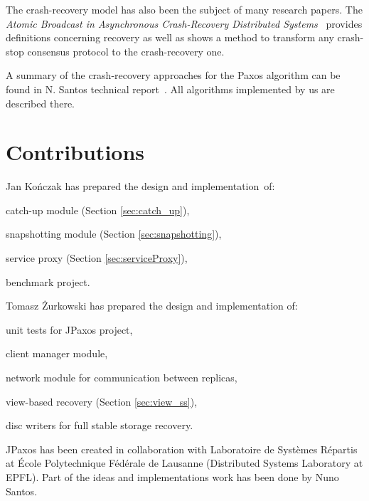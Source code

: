 The crash-recovery model has also been the subject of many research papers. \linebreak The \textit{Atomic Broadcast in Asynchronous Crash-Recovery Distributed Systems}~\cite{rodriguez2000atomic} provides definitions concerning recovery as well as shows a method to transform any crash-stop consensus protocol to the crash-recovery one.

A summary of the crash-recovery approaches for the Paxos algorithm can be found in N. Santos technical report~\cite{Nun10}. All algorithms implemented by us are described there.

\section{Contributions}

Jan Kończak has prepared the design and implementation~of:
\begin{tightList}
  \item[\textbullet] catch-up module (Section \ref{sec:catch_up}),
  \item[\textbullet] snapshotting module (Section \ref{sec:snapshotting}),
  \item[\textbullet] service proxy  (Section \ref{sec:serviceProxy}),
  \item[\textbullet] benchmark project.
\end{tightList}

\noindent Tomasz Żurkowski has prepared the design and implementation of:
\begin{tightList}
  \item[\textbullet] unit tests for JPaxos project,
  \item[\textbullet] client manager module, 
  \item[\textbullet] network module for communication between replicas,
  \item[\textbullet] view-based recovery (Section \ref{sec:view_ss}),
  \item[\textbullet] disc writers for full stable storage recovery.
\end{tightList}

\noindent JPaxos has been created in collaboration with Laboratoire de Systèmes Répartis at École Polytechnique Fédérale de Lausanne (Distributed Systems Laboratory at EPFL). Part of the ideas and implementations work has been done by Nuno Santos.

